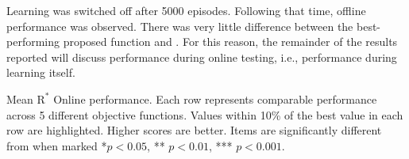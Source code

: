 Learning was switched off after 5000 episodes. Following that time, offline performance was observed. There was very little difference between the best-performing proposed function and \tloA{}. For this reason, the remainder of the results reported will discuss performance during online testing, i.e., performance during learning itself.%


\begin{table}[t]
\footnotesize
  \caption{Mean $\text{R}^*$ Online performance. Each row represents comparable performance across 5 different objective functions. Values within 10\% of the best value in each row are highlighted. Higher scores are better. Items are significantly different from \tloA{} when marked *$p<0.05$, ** $p <0.01$, *** $p<0.001$.}
  \label{tab:mean_r_star_performance}
\begin{adjustbox}{width=\columnwidth}

\end{adjustbox}
\end{table}

 


